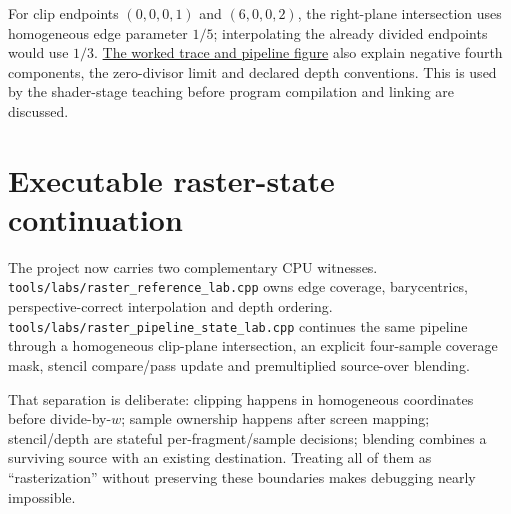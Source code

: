 For clip endpoints \((0,0,0,1)\) and \((6,0,0,2)\), the right-plane intersection uses homogeneous edge parameter \(1/5\); interpolating the already divided endpoints would use \(1/3\). \href{Continuous\%20Notes/Game\%20Engine\%20-\%20From\%20First\%20Frame\%20to\%20Living\%20Worlds\#Clip\%20coordinates\%20are\%20not\%20normalized\%20device\%20coordinates}{The worked trace and pipeline figure} also explain negative fourth components, the zero-divisor limit and declared depth conventions. This is used by the shader-stage teaching before program compilation and linking are discussed.

\section{Executable raster-state continuation}\label{appendix-40426e4b2103-executable-raster-state-continuation}

The project now carries two complementary CPU witnesses. \texttt{tools/labs/raster\_reference\_lab.cpp} owns edge coverage, barycentrics, perspective-correct interpolation and depth ordering. \texttt{tools/labs/raster\_pipeline\_state\_lab.cpp} continues the same pipeline through a homogeneous clip-plane intersection, an explicit four-sample coverage mask, stencil compare/pass update and premultiplied source-over blending.

That separation is deliberate: clipping happens in homogeneous coordinates before divide-by-\(w\); sample ownership happens after screen mapping; stencil/depth are stateful per-fragment/sample decisions; blending combines a surviving source with an existing destination. Treating all of them as ``rasterization'' without preserving these boundaries makes debugging nearly impossible.
